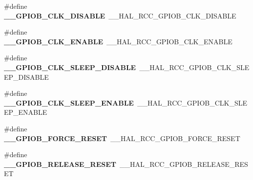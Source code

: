 \begin{DoxyCompactItemize}
\item 
\hypertarget{group___h_a_l___r_c_c___aliased_ga239e9fd9a5eec0eea9cdd224f556b9af}{\#define {\bfseries \-\_\-\-\_\-\-G\-P\-I\-O\-B\-\_\-\-C\-L\-K\-\_\-\-D\-I\-S\-A\-B\-L\-E}~\-\_\-\-\_\-\-H\-A\-L\-\_\-\-R\-C\-C\-\_\-\-G\-P\-I\-O\-B\-\_\-\-C\-L\-K\-\_\-\-D\-I\-S\-A\-B\-L\-E}\label{group___h_a_l___r_c_c___aliased_ga239e9fd9a5eec0eea9cdd224f556b9af}

\item 
\hypertarget{group___h_a_l___r_c_c___aliased_ga682feb02f7018ef895fe2ffe8e595aaf}{\#define {\bfseries \-\_\-\-\_\-\-G\-P\-I\-O\-B\-\_\-\-C\-L\-K\-\_\-\-E\-N\-A\-B\-L\-E}~\-\_\-\-\_\-\-H\-A\-L\-\_\-\-R\-C\-C\-\_\-\-G\-P\-I\-O\-B\-\_\-\-C\-L\-K\-\_\-\-E\-N\-A\-B\-L\-E}\label{group___h_a_l___r_c_c___aliased_ga682feb02f7018ef895fe2ffe8e595aaf}

\item 
\hypertarget{group___h_a_l___r_c_c___aliased_ga20b3699e4c7ad29d97944199f03c3b43}{\#define {\bfseries \-\_\-\-\_\-\-G\-P\-I\-O\-B\-\_\-\-C\-L\-K\-\_\-\-S\-L\-E\-E\-P\-\_\-\-D\-I\-S\-A\-B\-L\-E}~\-\_\-\-\_\-\-H\-A\-L\-\_\-\-R\-C\-C\-\_\-\-G\-P\-I\-O\-B\-\_\-\-C\-L\-K\-\_\-\-S\-L\-E\-E\-P\-\_\-\-D\-I\-S\-A\-B\-L\-E}\label{group___h_a_l___r_c_c___aliased_ga20b3699e4c7ad29d97944199f03c3b43}

\item 
\hypertarget{group___h_a_l___r_c_c___aliased_ga97469fa272efddfa708b072ea1ead4d9}{\#define {\bfseries \-\_\-\-\_\-\-G\-P\-I\-O\-B\-\_\-\-C\-L\-K\-\_\-\-S\-L\-E\-E\-P\-\_\-\-E\-N\-A\-B\-L\-E}~\-\_\-\-\_\-\-H\-A\-L\-\_\-\-R\-C\-C\-\_\-\-G\-P\-I\-O\-B\-\_\-\-C\-L\-K\-\_\-\-S\-L\-E\-E\-P\-\_\-\-E\-N\-A\-B\-L\-E}\label{group___h_a_l___r_c_c___aliased_ga97469fa272efddfa708b072ea1ead4d9}

\item 
\hypertarget{group___h_a_l___r_c_c___aliased_ga990dc020ec85121fcb117c62b01e93b8}{\#define {\bfseries \-\_\-\-\_\-\-G\-P\-I\-O\-B\-\_\-\-F\-O\-R\-C\-E\-\_\-\-R\-E\-S\-E\-T}~\-\_\-\-\_\-\-H\-A\-L\-\_\-\-R\-C\-C\-\_\-\-G\-P\-I\-O\-B\-\_\-\-F\-O\-R\-C\-E\-\_\-\-R\-E\-S\-E\-T}\label{group___h_a_l___r_c_c___aliased_ga990dc020ec85121fcb117c62b01e93b8}

\item 
\hypertarget{group___h_a_l___r_c_c___aliased_ga87ff49df25db0b75b147e867febc2cbe}{\#define {\bfseries \-\_\-\-\_\-\-G\-P\-I\-O\-B\-\_\-\-R\-E\-L\-E\-A\-S\-E\-\_\-\-R\-E\-S\-E\-T}~\-\_\-\-\_\-\-H\-A\-L\-\_\-\-R\-C\-C\-\_\-\-G\-P\-I\-O\-B\-\_\-\-R\-E\-L\-E\-A\-S\-E\-\_\-\-R\-E\-S\-E\-T}\label{group___h_a_l___r_c_c___aliased_ga87ff49df25db0b75b147e867febc2cbe}


\end{DoxyCompactItemize}
